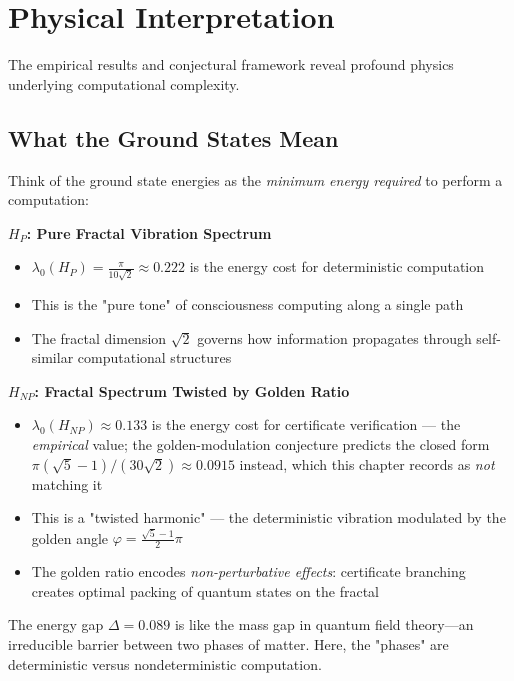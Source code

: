 \section{Physical Interpretation}

The empirical results and conjectural framework reveal profound physics underlying computational complexity.

\subsection{What the Ground States Mean}

\begin{intuitive}
Think of the ground state energies as the \textit{minimum energy required} to perform a computation:

\textbf{$H_P$: Pure Fractal Vibration Spectrum}
\begin{itemize}
\item $\lambda_0(H_P) = \frac{\pi}{10\sqrt{2}} \approx 0.222$ is the energy cost for deterministic computation
\item This is the "pure tone" of consciousness computing along a single path
\item The fractal dimension $\sqrt{2}$ governs how information propagates through self-similar computational structures
\end{itemize}

\textbf{$H_{NP}$: Fractal Spectrum Twisted by Golden Ratio}
\begin{itemize}
\item $\lambda_0(H_{NP}) \approx 0.133$ is the energy cost for certificate verification --- the \emph{empirical} value; the golden-modulation conjecture predicts the closed form $\pi(\sqrt{5}-1)/(30\sqrt{2}) \approx 0.0915$ instead, which this chapter records as \emph{not} matching it
\item This is a "twisted harmonic" — the deterministic vibration modulated by the golden angle $\varphi = \frac{\sqrt{5}-1}{2}\pi$
\item The golden ratio encodes \textit{non-perturbative effects}: certificate branching creates optimal packing of quantum states on the fractal
\end{itemize}

The energy gap $\Delta = 0.089$ is like the mass gap in quantum field theory—an irreducible barrier between two phases of matter. Here, the "phases" are deterministic versus nondeterministic computation.
\end{intuitive}

